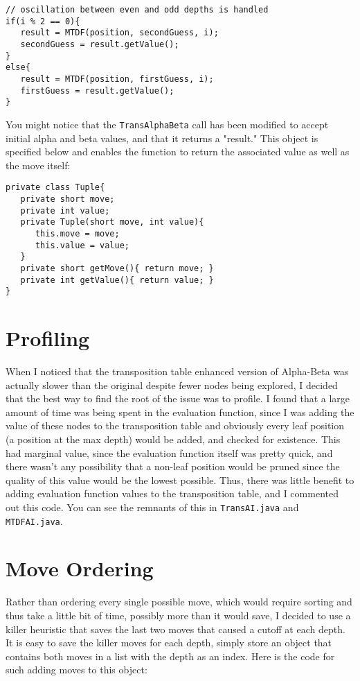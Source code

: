 \documentclass[11pt, oneside]{article}%
\begin{document}
\begin{lstlisting}
// oscillation between even and odd depths is handled
if(i % 2 == 0){
   result = MTDF(position, secondGuess, i);
   secondGuess = result.getValue();
}
else{
   result = MTDF(position, firstGuess, i);
   firstGuess = result.getValue();
}
\end{lstlisting}

You might notice that the \verb`TransAlphaBeta` call has been modified to accept initial alpha and beta values, and that it returns a "result."  This object is specified below and enables the function to return the associated value as well as the move itself:

\begin{lstlisting}
private class Tuple{
   private short move;
   private int value;
   private Tuple(short move, int value){
      this.move = move;
      this.value = value;
   }
   private short getMove(){ return move; }      
   private int getValue(){ return value; }
}
\end{lstlisting}
\section{Profiling}
When I noticed that the transposition table enhanced version of Alpha-Beta was actually slower than the original despite fewer nodes being explored, I decided that the best way to find the root of the issue was to profile.  I found that a large amount of time was being spent in the evaluation function, since I was adding the value of these nodes to the transposition table and obviously every leaf position (a position at the max depth) would be added, and checked for existence.  This had marginal value, since the evaluation function itself was pretty quick, and there wasn't any possibility that a non-leaf position would be pruned since the quality of this value would be the lowest possible.  Thus, there was little benefit to adding evaluation function values to the transposition table, and I commented out this code.  You can see the remnants of this in \verb`TransAI.java` and \verb`MTDFAI.java`.

\section{Move Ordering}
Rather than ordering every single possible move, which would require sorting and thus take a little bit of time, possibly more than it would save, I decided to use a killer heuristic that saves the last two moves that caused a cutoff at each depth.  It is easy to save the killer moves for each depth, simply store an object that contains both moves in a list with the depth as an index.  Here is the code for such adding moves to this object:
\end{document}
